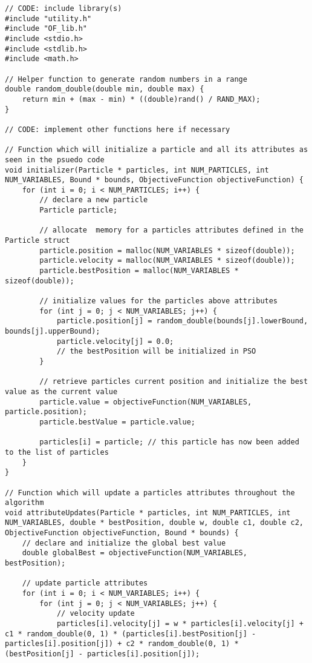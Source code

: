 \documentclass[12pt]{article}
\begin{document}
	\begin{lstlisting}[basicstyle=\small]
	// CODE: include library(s)
#include "utility.h"
#include "OF_lib.h"
#include <stdio.h> 
#include <stdlib.h> 
#include <math.h> 

// Helper function to generate random numbers in a range
double random_double(double min, double max) {
    return min + (max - min) * ((double)rand() / RAND_MAX);
}

// CODE: implement other functions here if necessary

// Function which will initialize a particle and all its attributes as seen in the psuedo code 
void initializer(Particle * particles, int NUM_PARTICLES, int NUM_VARIABLES, Bound * bounds, ObjectiveFunction objectiveFunction) {
    for (int i = 0; i < NUM_PARTICLES; i++) {
        // declare a new particle 
        Particle particle; 
        
        // allocate  memory for a particles attributes defined in the Particle struct
        particle.position = malloc(NUM_VARIABLES * sizeof(double)); 
        particle.velocity = malloc(NUM_VARIABLES * sizeof(double)); 
        particle.bestPosition = malloc(NUM_VARIABLES * sizeof(double)); 

        // initialize values for the particles above attributes 
        for (int j = 0; j < NUM_VARIABLES; j++) {
            particle.position[j] = random_double(bounds[j].lowerBound, bounds[j].upperBound); 
            particle.velocity[j] = 0.0; 
            // the bestPosition will be initialized in PSO 
        }

        // retrieve particles current position and initialize the best value as the current value
        particle.value = objectiveFunction(NUM_VARIABLES, particle.position);
        particle.bestValue = particle.value; 

        particles[i] = particle; // this particle has now been added to the list of particles
    }
}

// Function which will update a particles attributes throughout the algorithm 
void attributeUpdates(Particle * particles, int NUM_PARTICLES, int NUM_VARIABLES, double * bestPosition, double w, double c1, double c2, ObjectiveFunction objectiveFunction, Bound * bounds) {
    // declare and initialize the global best value 
    double globalBest = objectiveFunction(NUM_VARIABLES, bestPosition); 

    // update particle attributes 
    for (int i = 0; i < NUM_VARIABLES; i++) {
        for (int j = 0; j < NUM_VARIABLES; j++) {
            // velocity update 
            particles[i].velocity[j] = w * particles[i].velocity[j] + c1 * random_double(0, 1) * (particles[i].bestPosition[j] - particles[i].position[j]) + c2 * random_double(0, 1) * (bestPosition[j] - particles[i].position[j]); 
            

\end{lstlisting}
\end{document}
